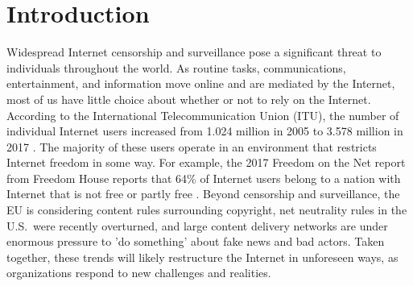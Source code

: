 \documentclass[10pt, conference, letterpaper]{IEEEtran}
\newcommand{\toolname}{{\textcolor{blue}TOOL\_NAME }}
\begin{document}

\section{Introduction}

\par Widespread Internet censorship and surveillance pose a
significant threat to individuals throughout the world. As routine
tasks, communications, entertainment, and information move online and
are mediated by the Internet, most of us have little choice about
whether or not to rely on the Internet.  According to the
International Telecommunication Union (ITU), the number of individual
Internet users increased from 1.024 million in 2005 to 3.578 million
in 2017 \cite{itu}. The majority of these users operate in an
environment that restricts Internet freedom in some way. For example,
the 2017 Freedom on the Net report from Freedom House reports that
64\% of Internet users belong to a nation with Internet that is not
free or partly free \cite{FOTN}.  Beyond censorship and surveillance,
the EU is considering content rules surrounding copyright, net
neutrality rules in the U.S.\ were recently overturned, and large
content delivery networks are under enormous pressure to 'do
something' about fake news and bad actors. Taken together, these
trends will likely restructure the Internet in unforeseen ways,
as organizations respond to new challenges and realities.
\end{document}
